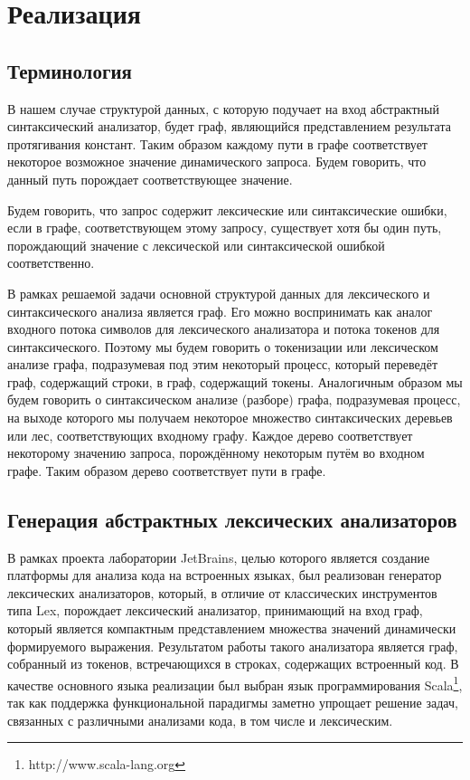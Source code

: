 \section{Реализация}
\subsection{Терминология}
В нашем случае структурой данных, с которую подучает на вход абстрактный 
синтаксический анализатор, будет граф, являющийся представлением результата 
протягивания констант. Таким образом каждому пути в графе соответствует некоторое 
возможное значение динамического запроса. Будем говорить, что данный путь 
порождает соответствующее значение.

Будем говорить, что запрос содержит лексические или синтаксические ошибки, 
если в графе, соответствующем этому запросу, существует хотя бы один путь, 
порождающий значение с лексической или синтаксической ошибкой соответственно.

В рамках решаемой задачи основной структурой данных для лексического и 
синтаксического анализа является граф. Его можно воспринимать как аналог 
входного потока символов для лексического анализатора и потока токенов для 
синтаксического. Поэтому мы будем говорить о токенизации или лексическом анализе 
графа, подразумевая под этим некоторый процесс, который переведёт граф, 
содержащий строки, в граф, содержащий токены. Аналогичным образом мы будем 
говорить о синтаксическом анализе (разборе) графа, подразумевая процесс, на 
выходе которого мы получаем некоторое множество синтаксических деревьев или лес, 
соответствующих входному графу. Каждое дерево соответствует некоторому значению 
запроса, порождённому некоторым путём во входном графе. Таким образом дерево 
соответствует пути в графе.

\subsection{Генерация абстрактных лексических анализаторов}
В рамках проекта лаборатории JetBrains, целью которого является создание 
платформы для анализа кода на встроенных языках, был реализован генератор 
лексических анализаторов, который, в отличие от классических инструментов типа 
Lex, порождает лексический анализатор, принимающий на вход граф, который 
является компактным представлением множества значений динамически формируемого 
выражения. Результатом работы такого анализатора является граф, собранный из 
токенов, встречающихся в строках, содержащих встроенный код. В качестве 
основного языка реализации был выбран язык программирования Scala\footnote{http://www.scala-lang.org}, так как 
поддержка функциональной парадигмы заметно упрощает решение задач, связанных с 
различными анализами кода, в том числе и лексическим.

